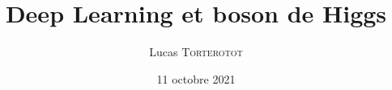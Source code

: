 \documentclass[10pt,aspectratio=169]{beamer}
\institute[L. Raspail]{Lycée Raspail -- Paris} %
\title{\textbf{Deep Learning et boson de Higgs}}
\author[Lucas \textsc{Torterotot} -- \mailto{lucas.torterotot@gmail.com}]{Lucas \textsc{Torterotot}}
\date{11 octobre 2021}
\begin{document}
\def\mythousandsep{\,}

%
%
%
%
%
%
%
%
%
%
%
%
%
\end{document}
